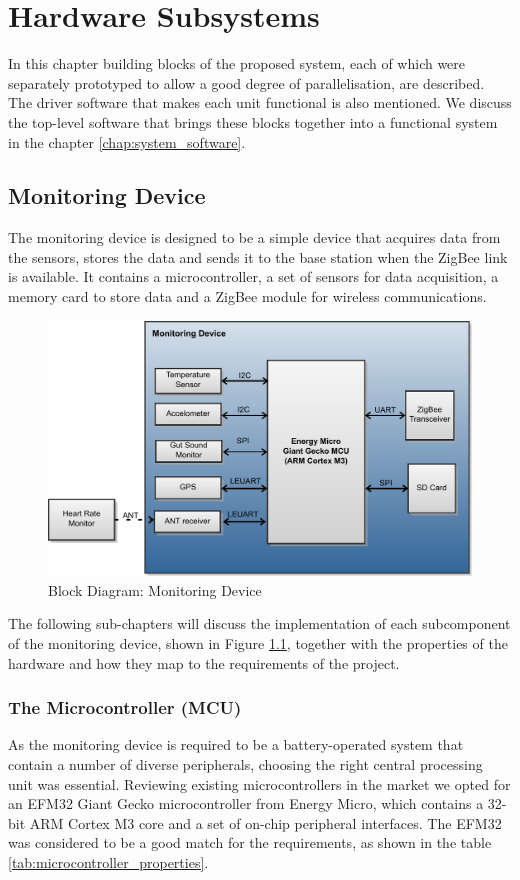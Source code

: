 \chapter{Hardware Subsystems}
\label{chap:hardware_subsystems}
In this chapter building blocks of the proposed system, each of which were separately prototyped to allow a good degree of parallelisation, are described. The driver software that makes each unit functional is also mentioned. We discuss the top-level software that brings these blocks together into a functional system in the chapter \ref{chap:system_software}.


\section{Monitoring Device}
The monitoring device is designed to be a simple device that acquires data from the sensors, stores the data and sends it to the base station when the ZigBee link is available. It contains a microcontroller, a set of sensors for data acquisition, a memory card to store data and a ZigBee module for wireless communications.

\begin{figure}
\includegraphics[width=\textwidth]{Images/MonitoringDeviceBlockDiagram}
\caption{Block Diagram: Monitoring Device}
\label{fig:monitoring_device_block}
\end{figure}

The following sub-chapters will discuss the implementation of each subcomponent of the monitoring device, shown in Figure \ref{fig:monitoring_device_block}, together with the properties of the hardware and how they map to the requirements of the project.


\subsection{The Microcontroller (MCU)}
As the monitoring device is required to be a battery-operated system that contain a number of diverse peripherals, choosing the right central processing unit was essential. Reviewing existing microcontrollers in the market we opted for an EFM32 Giant Gecko microcontroller from Energy Micro, which contains a 32-bit ARM Cortex M3 core and a set of on-chip peripheral interfaces. The EFM32 was considered to be a good match for the requirements, as shown in the table \ref{tab:microcontroller_properties}.

